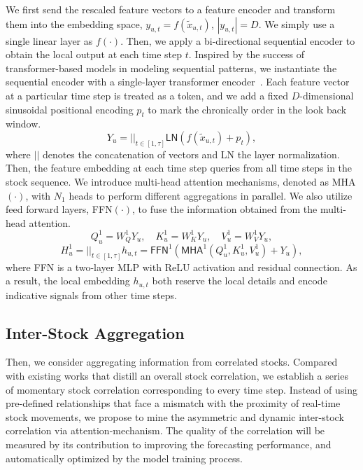 We first send the rescaled feature vectors to a feature encoder and transform them into the embedding space, $y_{u,t}=f(\tilde{x}_{u,t})$, $|y_{u,t}|=D$. We simply use a single linear layer as $f(\cdot)$.
Then, we apply a bi-directional sequential encoder to obtain the local output at each time step $t$.
Inspired by the success of transformer-based models in modeling sequential patterns, we instantiate the sequential encoder with a single-layer transformer encoder~\cite{vaswani2017attention}.
Each feature vector at a particular time step is treated as a token, and we add a fixed $D$-dimensional sinusoidal positional encoding $p_{t}$ to mark the chronically order in the look back window.  
$$Y_u=||_{t\in[1,\tau]}\textsf{LN}(f(\tilde{x}_{u,t})+p_t),$$ where $||$ denotes the concatenation of vectors and \textsf{LN} the layer normalization. Then, the feature embedding at each time step queries from all time steps in the stock sequence. 
We introduce multi-head attention mechanisms, denoted as \textsf{MHA}$(\cdot)$,  with $N_1$ heads to perform different aggregations in parallel. We also utilize feed forward layers, \textsf{FFN}$(\cdot )$, to fuse the information obtained from the multi-head attention.
$$ Q^1_u=W^1_QY_u,\quad K^1_u=W^1_KY_u,\quad V^1_u=W^1_VY_u,$$
$$ H^1_u=||_{t\in[1,\tau ]} h_{u,t} =\textsf{FFN}^1(\textsf{MHA}^1(Q^1_u,K^1_u,V^1_u)+Y_u),$$
where \textsf{FFN} is a two-layer MLP with ReLU activation and residual connection. As a result, the local embedding $h_{u,t}$ both reserve the local details and encode indicative signals from other time steps. 

\subsection{Inter-Stock Aggregation}
Then, we consider aggregating information from correlated stocks. 
Compared with existing works that distill an overall stock correlation, we establish a series of momentary stock correlation corresponding to every time step.
Instead of using pre-defined relationships that face a mismatch with the proximity of real-time stock movements, we propose to mine the asymmetric and dynamic inter-stock correlation via attention-mechanism.
The quality of the correlation will be measured by its contribution to improving the forecasting performance, and automatically optimized by the model training process.

